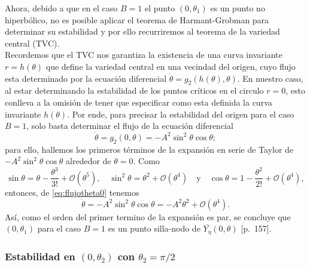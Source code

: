 \noindent Ahora, debido a que en el caso $B=1$ el punto $(0,\theta_1)$ es un punto no hiperbólico, no es posible aplicar el teorema de Harmant-Grobman para determinar su estabilidad y por ello recurriremos al teorema de la variedad central (TVC). \\

\noindent Recordemos que el TVC nos garantiza la existencia de una curva invariante $r = h(\theta)$ que define la variedad central en una vecindad del origen, cuyo flujo esta determinado por la ecuación diferencial $\dot{\theta} = g_2(h(\theta), \theta)$. En nuestro caso, al estar determinando la estabilidad de los puntos críticos en el circulo ${r = 0}$, esto conlleva a la omisión de tener que especificar como esta definida la curva invariante $h(\theta)$. Por ende, para precisar la estabilidad del origen para el caso $B = 1$, solo basta determinar el flujo de la ecuación diferencial
\begin{equation}
	\dot{\theta} = g_2(0, \theta) = - A^2 \sin ^2 \theta \cos \theta;
	\label{eq:flujotheta0}
\end{equation}
para ello, hallemos los primeros términos de la expansión en serie de Taylor de $ - A^2 \sin ^2 \theta \cos \theta$ alrededor de $\theta = 0$. Como
$$
	\sin \theta = \theta - \dfrac{\theta^3}{3!} + \mathcal{O}(\theta^ 5), \quad
	\sin^2 \theta = \theta^2 + \mathcal{O}(\theta^ 4) \quad \text{y} \quad
	\cos \theta = 1 - \dfrac{\theta^2}{2!} + \mathcal{O}(\theta^ 4),
$$
%
entonces, de \eqref{eq:flujotheta0} tenemos 
\begin{equation*}
	\dot{\theta} = - A^2 \sin ^2 \theta \cos \theta = -A^2 \theta^2 + \mathcal{O}(\theta^ 4).
\end{equation*}
Así, como el orden del primer termino de la expansión es par, se concluye que $(0, \theta_1)$ para el caso $B=1$ es un punto silla-nodo de $\bar{Y_{\eta}}(0,\theta)$ \cite{perko2001}[p.~157].

\subsubsection*{Estabilidad en $(0, \theta_2)$ con $\theta_2=\pi/2$}

